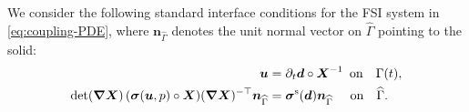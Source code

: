 \documentclass[11pt,reqno]{amsart}
\theoremstyle{definition}
\theoremstyle{plain}
\numberwithin{theorem}{section}
\numberwithin{proposition}{section}
\numberwithin{lemma}{section}
\numberwithin{equation}{section}
\newcommand{\bs}[1]{\boldsymbol{#1}}
\newcommand{\uu}[1]  {{\bs{#1}} }
\newcommand{\grad}   { \uu{\nabla}    }
\newcommand{\bu}{\uu{u}}
\newcommand{\bn}{{\bs n}}
\def\b{\color{blue}}
\renewcommand{\(}{\bigl(}
\renewcommand{\)}{\bigr)}
\begin{document}
We consider the following standard interface conditions for the FSI system in \eqref{eq:coupling-PDE}, where $\bn_{\widehat\Gamma}$ denotes the unit normal vector on $\widehat\Gamma$ pointing to the solid: 
\begin{subequations}\label{eq:coupling-nl}
\begin{align}
{\bs u}&= \partial_t{\bs d} \circ {\bs X}^{-1} \hspace{5pt}  \mbox{on}\quad  \Gamma(t), \label{eq:coupling-nl-a}\\
\det(\grad{\bs X}) \,({\bs\sigma} (\bu,p) \circ{\bs X}) (\grad{\bs X})^{-\top}{\bs n}_{\widehat\Gamma} &= {\bs\sigma}^{\rm s}({\bs d}) {\bs n}_{\widehat\Gamma} \hspace{13.5pt}  \mbox{on}\quad \widehat\Gamma. \label{eq:coupling-nl-b}
\end{align}
\end{subequations}
%
%
\end{document}
